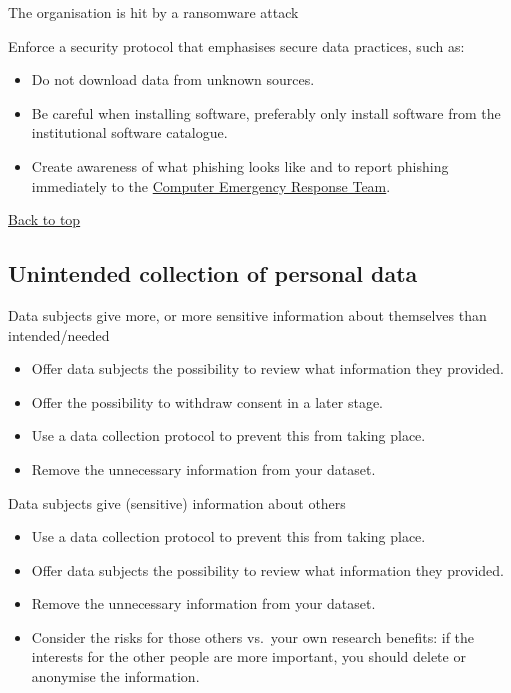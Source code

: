 \documentclass[
]{book}
\providecommand{\tightlist}{%
  \setlength{\itemsep}{0pt}\setlength{\parskip}{0pt}}
\begin{document}
The organisation is hit by a ransomware attack

Enforce a security protocol that emphasises secure data practices, such as:

\begin{itemize}
\tightlist
\item
  Do not download data from unknown sources.
\item
  Be careful when installing software, preferably only install software from
  the institutional software catalogue.
\item
  Create awareness of what phishing looks like and to report phishing
  immediately to the
  \href{https://intranet.uu.nl/en/security/information-security-computer-misuse-or-report-incident-cert}{Computer Emergency Response Team}.
\end{itemize}

\protect\hyperlink{example-risks}{Back to top}

\hypertarget{unintended-collection}{%
\subsection{Unintended collection of personal data}\label{unintended-collection}}

Data subjects give more, or more sensitive information about
themselves than intended/needed

\begin{itemize}
\tightlist
\item
  Offer data subjects the possibility to review what information they provided.
\item
  Offer the possibility to withdraw consent in a later stage.
\item
  Use a data collection protocol to prevent this from taking place.
\item
  Remove the unnecessary information from your dataset.\\
\end{itemize}

Data subjects give (sensitive) information about others

\begin{itemize}
\tightlist
\item
  Use a data collection protocol to prevent this from taking place.
\item
  Offer data subjects the possibility to review what information they provided.
\item
  Remove the unnecessary information from your dataset.
\item
  Consider the risks for those others vs.~your own research benefits: if the
  interests for the other people are more important, you should delete or
  anonymise the information.\\
\end{itemize}
\end{document}
